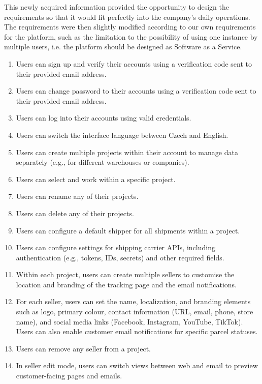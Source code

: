 This newly acquired information provided the opportunity to design the requirements so that it would fit perfectly into the company's daily operations. 
The requirements were then slightly modified according to our own requirements for the platform, such as the limitation to the possibility of using one instance by multiple users, i.e. the platform should be designed as Software as a Service.

\begin{enumerate}[label=\bfseries FR\arabic*:,leftmargin=*]
    \item Users can sign up and verify their accounts using a verification code sent to their provided email address.
    \item Users can change password to their accounts using a verification code sent to their provided email address.
    \item Users can log into their accounts using valid credentials.
    \item Users can switch the interface language between Czech and English.
    \item Users can create multiple projects within their account to manage data separately (e.g., for different warehouses or companies).
    \item Users can select and work within a specific project.
    \item Users can rename any of their projects.
    \item Users can delete any of their projects.
    \item Users can configure a default shipper for all shipments within a project.
    \item Users can configure settings for shipping carrier APIs, including authentication (e.g., tokens, IDs, secrets) and other required fields.
    \item Within each project, users can create multiple sellers to customise the location and branding of the tracking page and the email notifications.
    \item For each seller, users can set the name, localization, and branding elements such as logo, primary colour, contact information (URL, email, phone, store name), and social media links (Facebook, Instagram, YouTube, TikTok). Users can also enable customer email notifications for specific parcel statuses.
    \item Users can remove any seller from a project.
    \item In seller edit mode, users can switch views between web and email to preview customer-facing pages and emails.

\end{enumerate}
